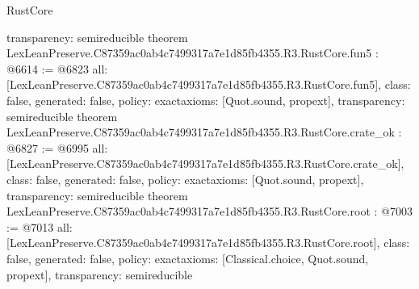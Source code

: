 \begin{lexlean}{RustCore}
\begin{coremodule}
{  transparency: semireducible
}
theorem LexLeanPreserve.C87359ac0ab4c7499317a7e1d85fb4355.R3.RustCore.fun5 : @6614 := @6823 {
  all: [LexLeanPreserve.C87359ac0ab4c7499317a7e1d85fb4355.R3.RustCore.fun5],
  class: false,
  generated: false,
  policy: exact{axioms: [Quot.sound, propext]},
  transparency: semireducible
}
theorem LexLeanPreserve.C87359ac0ab4c7499317a7e1d85fb4355.R3.RustCore.crate_ok : @6827 := @6995 {
  all: [LexLeanPreserve.C87359ac0ab4c7499317a7e1d85fb4355.R3.RustCore.crate_ok],
  class: false,
  generated: false,
  policy: exact{axioms: [Quot.sound, propext]},
  transparency: semireducible
}
theorem LexLeanPreserve.C87359ac0ab4c7499317a7e1d85fb4355.R3.RustCore.root : @7003 := @7013 {
  all: [LexLeanPreserve.C87359ac0ab4c7499317a7e1d85fb4355.R3.RustCore.root],
  class: false,
  generated: false,
  policy: exact{axioms: [Classical.choice, Quot.sound, propext]},
  transparency: semireducible
}


\end{coremodule}
\end{lexlean}
